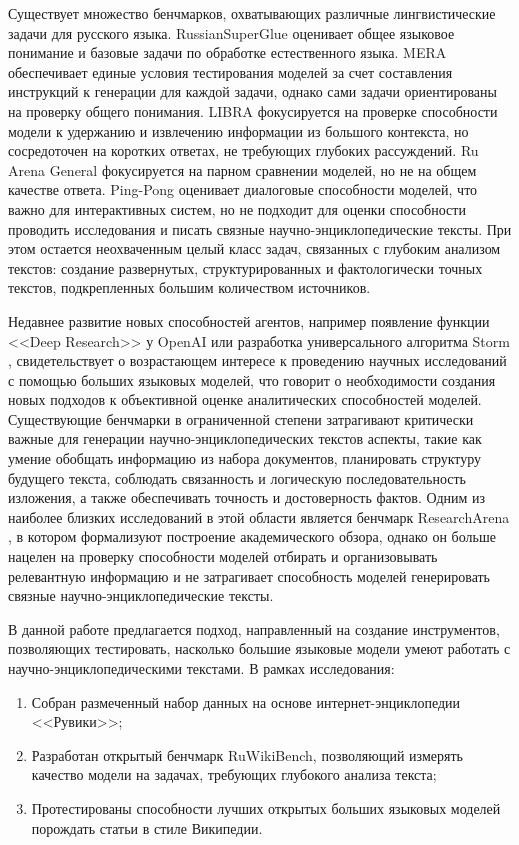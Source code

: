 \documentclass{article}
\begin{document}
Существует множество бенчмарков, охватывающих различные лингвистические задачи для русского языка.
RussianSuperGlue \cite{rsglue} оценивает общее языковое понимание и базовые задачи по обработке естественного языка. 
MERA \cite{mera} обеспечивает единые условия тестирования моделей за счет составления инструкций к генерации для каждой задачи, однако сами задачи ориентированы на проверку общего понимания. 
LIBRA \cite{libra} фокусируется на проверке способности модели к удержанию и извлечению информации из большого контекста, но сосредоточен на коротких ответах, не требующих глубоких рассуждений. 
Ru Arena General \cite{arena} фокусируется на парном сравнении моделей, но не на общем качестве ответа.
Ping-Pong \cite{pp} оценивает диалоговые способности моделей, что важно для интерактивных систем, но не подходит для оценки способности проводить исследования и писать связные научно-энциклопедические тексты.
При этом остается неохваченным целый класс задач, связанных с глубоким анализом текстов: создание развернутых, структурированных и фактологически точных текстов, подкрепленных большим количеством источников. 

Недавнее развитие новых способностей агентов, например появление функции <<Deep Research>> у OpenAI \cite{deepr} или разработка универсального алгоритма Storm \cite{storm}, 
свидетельствует о возрастающем интересе к проведению научных исследований с помощью больших языковых моделей, 
что говорит о необходимости создания новых подходов к объективной оценке аналитических способностей моделей. 
Существующие бенчмарки в ограниченной степени затрагивают критически важные для генерации научно-энциклопедических текстов аспекты, 
такие как умение обобщать информацию из набора документов, планировать структуру будущего текста, соблюдать связанность и логическую последовательность изложения, а также обеспечивать точность и достоверность фактов. 
Одним из наиболее близких исследований в этой области является бенчмарк ResearchArena \cite{resar}, в котором формализуют построение академического обзора, 
однако он больше нацелен на проверку способности моделей отбирать и организовывать релевантную информацию и не затрагивает способность моделей генерировать связные научно-энциклопедические тексты.

В данной работе предлагается подход, направленный на создание 
инструментов, позволяющих тестировать, насколько большие языковые модели умеют работать с научно-энциклопедическими текстами.
В рамках исследования:
\begin{enumerate}

    \item Собран размеченный набор данных на основе интернет-энциклопедии <<Рувики>>;
    
    \item Разработан открытый бенчмарк RuWikiBench, позволяющий измерять качество модели на задачах, требующих глубокого анализа текста;
    
    \item Протестированы способности лучших открытых больших языковых моделей порождать статьи в стиле Википедии.

\end{enumerate}
\end{document}
